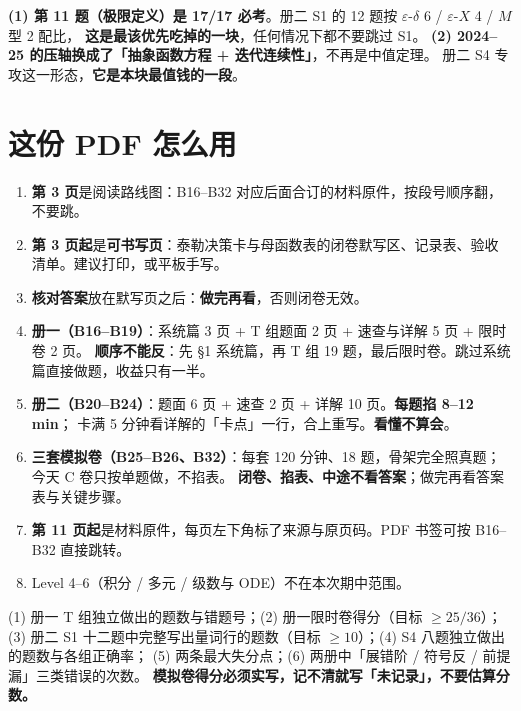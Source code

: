 \documentclass[10pt,a4paper]{ctexart}
\begin{document}
\begin{warnbox}[两条不可破的纪律]
\textbf{(1) 第 11 题（极限定义）是 17/17 必考}。册二 S1 的 12 题按 \texorpdfstring{$\varepsilon$-$\delta$ 6 / $\varepsilon$-$X$ 4 / $M$ 型 2}{eps-delta 6 / eps-X 4 / M 型 2} 配比，
\textbf{这是最该优先吃掉的一块}，任何情况下都不要跳过 S1。
\textbf{(2) 2024--25 的压轴换成了「抽象函数方程 + 迭代连续性」}，不再是中值定理。
册二 S4 专攻这一形态，\textbf{它是本块最值钱的一段}。
\end{warnbox}

\section*{这份 PDF 怎么用}
\begin{enumerate}
\item \textbf{第 3 页}是阅读路线图：B16--B32 对应后面合订的材料原件，按段号顺序翻，不要跳。
\item \textbf{第 3 页起}是\textbf{可书写页}：泰勒决策卡与母函数表的闭卷默写区、记录表、验收清单。建议打印，或平板手写。
\item \textbf{核对答案}放在默写页之后：\textbf{做完再看}，否则闭卷无效。
\item \textbf{册一（B16--B19）}：系统篇 3 页 + T 组题面 2 页 + 速查与详解 5 页 + 限时卷 2 页。
      \textbf{顺序不能反}：先 §1 系统篇，再 T 组 19 题，最后限时卷。跳过系统篇直接做题，收益只有一半。
\item \textbf{册二（B20--B24）}：题面 6 页 + 速查 2 页 + 详解 10 页。\textbf{每题掐 8--12 min}；
      卡满 5 分钟看详解的「卡点」一行，合上重写。\textbf{看懂不算会}。
\item \textbf{三套模拟卷（B25--B26、B32）}：每套 120 分钟、18 题，骨架完全照真题；今天 C 卷只按单题做，不掐表。
      \textbf{闭卷、掐表、中途不看答案}；做完再看答案表与关键步骤。
\item \textbf{第 11 页起}是材料原件，每页左下角标了来源与原页码。PDF 书签可按 B16--B32 直接跳转。
\item Level 4--6（积分 / 多元 / 级数与 ODE）不在本次期中范围。
\end{enumerate}

\begin{keypoint}[产出（明天的输入）]
(1) 册一 T 组独立做出的题数与错题号；(2) 册一限时卷得分（目标 $\geq 25/36$）；
(3) 册二 S1 十二题中完整写出量词行的题数（目标 $\geq 10$）；(4) S4 八题独立做出的题数与各组正确率；
(5) 两条最大失分点；(6) 两册中「展错阶 / 符号反 / 前提漏」三类错误的次数。
\textbf{模拟卷得分必须实写，记不清就写「未记录」，不要估算分数。}
\end{keypoint}
\end{document}
